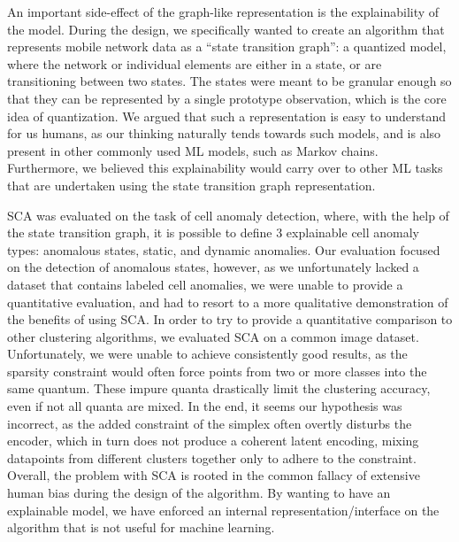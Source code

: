 	An important side-effect of the graph-like representation is the explainability of the model.
	During the design, we specifically wanted to create an algorithm that represents mobile network data as a ``state transition graph'': a quantized model, where the network or individual elements are either in a state, or are transitioning between two states.
	The states were meant to be granular enough so that they can be represented by a single prototype observation, which is the core idea of quantization.
	We argued that such a representation is easy to understand for us humans, as our thinking naturally tends towards such models, and is also present in other commonly used \ac{ML} models, such as Markov chains.
	Furthermore, we believed this explainability would carry over to other \ac{ML} tasks that are undertaken using the state transition graph representation.
	
	\ac{SCA} was evaluated on the task of cell anomaly detection, where, with the help of the state transition graph, it is possible to define $3$ explainable cell anomaly types: anomalous states, static, and dynamic anomalies.
	Our evaluation focused on the detection of anomalous states, however, as we unfortunately lacked a dataset that contains labeled cell anomalies, we were unable to provide a quantitative evaluation, and had to resort to a more qualitative demonstration of the benefits of using \ac{SCA}.
	In order to try to provide a quantitative comparison to other clustering algorithms, we evaluated \ac{SCA} on a common image dataset.
	Unfortunately, we were unable to achieve consistently good results, as the sparsity constraint would often force points from two or more classes into the same quantum.
	These impure quanta drastically limit the clustering accuracy, even if not all quanta are mixed.
	In the end, it seems our hypothesis was incorrect, as the added constraint of the simplex often overtly disturbs the encoder, which in turn does not produce a coherent latent encoding, mixing datapoints from different clusters together only to adhere to the constraint.
	Overall, the problem with \ac{SCA} is rooted in the common fallacy of extensive human bias during the design of the algorithm.
	By wanting to have an explainable model, we have enforced an internal representation/interface on the algorithm that is not useful for machine learning.
	
